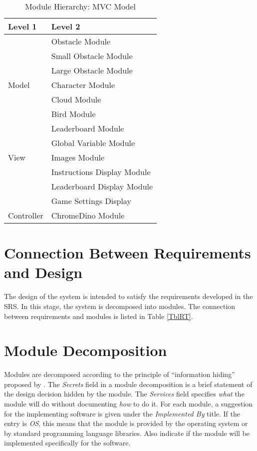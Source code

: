 \documentclass[12pt, titlepage]{article}
\begin{document}
    \begin{table}[h!]
    \centering
    \begin{tabular}{p{} p{}}
    \toprule
    \textbf{Level 1} & \textbf{Level 2}\\
    \midrule
    
    
    \multirow{7}{0.3\textwidth}{Model} 
    & Obstacle Module \\
    & Small Obstacle Module \\
    & Large Obstacle Module \\
    & Character Module \\
    & Cloud Module \\
    & Bird Module \\
    & Leaderboard Module \\
    \midrule
    
    \multirow{3}{0.3\textwidth}{View} 
    & Global Variable Module \\
    & Images Module \\
    & Instructions Display Module \\
    & Leaderboard Display Module \\
    & Game Settings Display\\ 
    \bottomrule
    
    \multirow{1.2}{0.3\textwidth}{Controller} 
    & ChromeDino Module \\
    \midrule
    
    \end{tabular}
    \caption{Module Hierarchy: MVC Model}
    \label{TblMH}
    \end{table}
    
    \section{Connection Between Requirements and Design} \label{SecConnection}
    
    The design of the system is intended to satisfy the requirements developed in
    the SRS. In this stage, the system is decomposed into modules. The connection
    between requirements and modules is listed in Table \ref{TblRT}.

    
    \section{Module Decomposition} \label{SecMD}

Modules are decomposed according to the principle of ``information hiding''
proposed by \citet{ParnasEtAl1984}. The \emph{Secrets} field in a module
decomposition is a brief statement of the design decision hidden by the
module. The \emph{Services} field specifies \emph{what} the module will do
without documenting \emph{how} to do it. For each module, a suggestion for the
implementing software is given under the \emph{Implemented By} title. If the
entry is \emph{OS}, this means that the module is provided by the operating
system or by standard programming language libraries.  Also indicate if the
module will be implemented specifically for the software.
\end{document}
